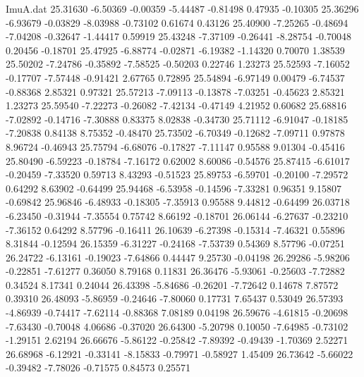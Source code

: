\begin{filecontents}{ImuA.dat}
  25.31630   -6.50369   -0.00359   -5.44487   -0.81498    0.47935   -0.10305
  25.36296   -6.93679   -0.03829   -8.03988   -0.73102    0.61674    0.43126
  25.40900   -7.25265   -0.48694   -7.04208   -0.32647   -1.44417    0.59919
  25.43248   -7.37109   -0.26441   -8.28754   -0.70048    0.20456   -0.18701
  25.47925   -6.88774   -0.02871   -6.19382   -1.14320    0.70070    1.38539
  25.50202   -7.24786   -0.35892   -7.58525   -0.50203    0.22746    1.23273
  25.52593   -7.16052   -0.17707   -7.57448   -0.91421    2.67765    0.72895
  25.54894   -6.97149    0.00479   -6.74537   -0.88368    2.85321    0.97321
  25.57213   -7.09113   -0.13878   -7.03251   -0.45623    2.85321    1.23273
  25.59540   -7.22273   -0.26082   -7.42134   -0.47149    4.21952    0.60682
  25.68816   -7.02892   -0.14716   -7.30888    0.83375    8.02838   -0.34730
  25.71112   -6.91047   -0.18185   -7.20838    0.84138    8.75352   -0.48470
  25.73502   -6.70349   -0.12682   -7.09711    0.97878    8.96724   -0.46943
  25.75794   -6.68076   -0.17827   -7.11147    0.95588    9.01304   -0.45416
  25.80490   -6.59223   -0.18784   -7.16172    0.62002    8.60086   -0.54576
  25.87415   -6.61017   -0.20459   -7.33520    0.59713    8.43293   -0.51523
  25.89753   -6.59701   -0.20100   -7.29572    0.64292    8.63902   -0.64499
  25.94468   -6.53958   -0.14596   -7.33281    0.96351    9.15807   -0.69842
  25.96846   -6.48933   -0.18305   -7.35913    0.95588    9.44812   -0.64499
  26.03718   -6.23450   -0.31944   -7.35554    0.75742    8.66192   -0.18701
  26.06144   -6.27637   -0.23210   -7.36152    0.64292    8.57796   -0.16411
  26.10639   -6.27398   -0.15314   -7.46321    0.55896    8.31844   -0.12594
  26.15359   -6.31227   -0.24168   -7.53739    0.54369    8.57796   -0.07251
  26.24722   -6.13161   -0.19023   -7.64866    0.44447    9.25730   -0.04198
  26.29286   -5.98206   -0.22851   -7.61277    0.36050    8.79168    0.11831
  26.36476   -5.93061   -0.25603   -7.72882    0.34524    8.17341    0.24044
  26.43398   -5.84686   -0.26201   -7.72642    0.14678    7.87572    0.39310
  26.48093   -5.86959   -0.24646   -7.80060    0.17731    7.65437    0.53049
  26.57393   -4.86939   -0.74417   -7.62114   -0.88368    7.08189    0.04198
  26.59676   -4.61815   -0.20698   -7.63430   -0.70048    4.06686   -0.37020
  26.64300   -5.20798    0.10050   -7.64985   -0.73102   -1.29151    2.62194
  26.66676   -5.86122   -0.25842   -7.89392   -0.49439   -1.70369    2.52271
  26.68968   -6.12921   -0.33141   -8.15833   -0.79971   -0.58927    1.45409
  26.73642   -5.66022   -0.39482   -7.78026   -0.71575    0.84573    0.25571

\end{filecontents}
